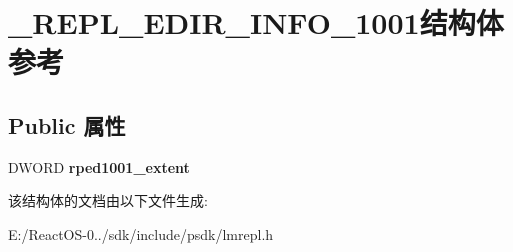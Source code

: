 \hypertarget{struct___r_e_p_l___e_d_i_r___i_n_f_o__1001}{}\section{\+\_\+\+R\+E\+P\+L\+\_\+\+E\+D\+I\+R\+\_\+\+I\+N\+F\+O\+\_\+1001结构体 参考}
\label{struct___r_e_p_l___e_d_i_r___i_n_f_o__1001}
\subsection*{Public 属性}
\begin{DoxyCompactItemize}
\item 
\mbox{\label{struct___r_e_p_l___e_d_i_r___i_n_f_o__1001_a6ff15bb8a1baab1f7c4b32c04ce51301}} 
D\+W\+O\+RD {\bfseries rped1001\+\_\+extent}
\end{DoxyCompactItemize}


该结构体的文档由以下文件生成\+:\begin{DoxyCompactItemize}
\item 
E\+:/\+React\+O\+S-\/0../sdk/include/psdk/lmrepl.\+h\end{DoxyCompactItemize}
